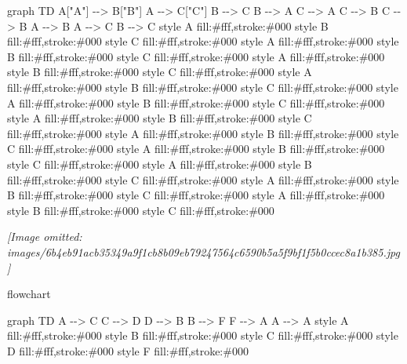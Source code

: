 \documentclass[
]{article}
\newenvironment{Shaded}{}{}
\newcommand{\NormalTok}[1]{#1}
\begin{document}
\begin{Shaded}
\begin{Highlighting}[]
\NormalTok{graph TD}
\NormalTok{    A["A"] {-}{-}\textgreater{} B["B"]}
\NormalTok{    A {-}{-}\textgreater{} C["C"]}
\NormalTok{    B {-}{-}\textgreater{} C}
\NormalTok{    B {-}{-}\textgreater{} A}
\NormalTok{    C {-}{-}\textgreater{} A}
\NormalTok{    C {-}{-}\textgreater{} B}
\NormalTok{    C {-}{-}\textgreater{} B}
\NormalTok{    A {-}{-}\textgreater{} B}
\NormalTok{    A {-}{-}\textgreater{} C}
\NormalTok{    B {-}{-}\textgreater{} C}
\NormalTok{    style A fill:\#fff,stroke:\#000}
\NormalTok{    style B fill:\#fff,stroke:\#000}
\NormalTok{    style C fill:\#fff,stroke:\#000}
\NormalTok{    style A fill:\#fff,stroke:\#000}
\NormalTok{    style B fill:\#fff,stroke:\#000}
\NormalTok{    style C fill:\#fff,stroke:\#000}
\NormalTok{    style A fill:\#fff,stroke:\#000}
\NormalTok{    style B fill:\#fff,stroke:\#000}
\NormalTok{    style C fill:\#fff,stroke:\#000}
\NormalTok{    style A fill:\#fff,stroke:\#000}
\NormalTok{    style B fill:\#fff,stroke:\#000}
\NormalTok{    style C fill:\#fff,stroke:\#000}
\NormalTok{    style A fill:\#fff,stroke:\#000}
\NormalTok{    style B fill:\#fff,stroke:\#000}
\NormalTok{    style C fill:\#fff,stroke:\#000}
\NormalTok{    style A fill:\#fff,stroke:\#000}
\NormalTok{    style B fill:\#fff,stroke:\#000}
\NormalTok{    style C fill:\#fff,stroke:\#000}
\NormalTok{    style A fill:\#fff,stroke:\#000}
\NormalTok{    style B fill:\#fff,stroke:\#000}
\NormalTok{    style C fill:\#fff,stroke:\#000}
\NormalTok{    style A fill:\#fff,stroke:\#000}
\NormalTok{    style B fill:\#fff,stroke:\#000}
\NormalTok{    style C fill:\#fff,stroke:\#000}
\NormalTok{    style A fill:\#fff,stroke:\#000}
\NormalTok{    style B fill:\#fff,stroke:\#000}
\NormalTok{    style C fill:\#fff,stroke:\#000}
\NormalTok{    style A fill:\#fff,stroke:\#000}
\NormalTok{    style B fill:\#fff,stroke:\#000}
\NormalTok{    style C fill:\#fff,stroke:\#000}
\NormalTok{    style A fill:\#fff,stroke:\#000}
\NormalTok{    style B fill:\#fff,stroke:\#000}
\NormalTok{    style C fill:\#fff,stroke:\#000}
\end{Highlighting}
\end{Shaded}

\textit{[Image omitted: images/6b4eb91acb35349a9f1cb8b09eb79247564c6590b5a5f9bf1f5b0ccec8a1b385.jpg]}

flowchart

\begin{Shaded}
\begin{Highlighting}[]
\NormalTok{graph TD}
\NormalTok{    A {-}{-}\textgreater{} C}
\NormalTok{    C {-}{-}\textgreater{} D}
\NormalTok{    D {-}{-}\textgreater{} B}
\NormalTok{    B {-}{-}\textgreater{} F}
\NormalTok{    F {-}{-}\textgreater{} A}
\NormalTok{    A {-}{-}\textgreater{} A}
\NormalTok{    style A fill:\#fff,stroke:\#000}
\NormalTok{    style B fill:\#fff,stroke:\#000}
\NormalTok{    style C fill:\#fff,stroke:\#000}
\NormalTok{    style D fill:\#fff,stroke:\#000}
\NormalTok{    style F fill:\#fff,stroke:\#000}
\end{Highlighting}
\end{Shaded}
\end{document}
